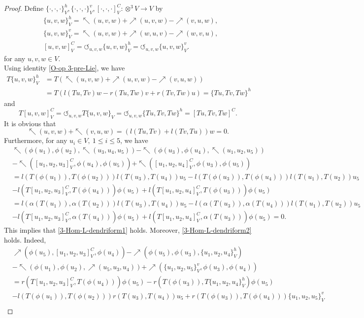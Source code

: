\documentclass[a4paper,11pt]{article}
\def\c{\cdot}
\def\nw{\nwarrow}
\def\ne{\nearrow}
\theoremstyle{definition}
\begin{document}
\begin{proof}
  Define $\{\c,\c,\c\}_V^h, \{\c,\c,\c\}_V^v,[\c,\c,\c]^C_V:\otimes^3V \to V$ by
\begin{align*}
& \{u,v,w\}_V^h=\nw(u,v,w)+\ne(u,v,w)-\ne(v,u,w),\\
& \{u,v,w\}_V^v=\nw(u,v,w)+\ne(w,u,v)-\ne(w,v,u),\\
&[u,v,w]^C_V=\circlearrowleft_{u,v,w}\{u,v,w\}_V^h=\circlearrowleft_{u,v,w}\{u,v,w\}_V^v.
\end{align*}
for any $u,v,w \in V$.\\
Using identity \eqref{O-op 3-pre-Lie}, we have
\begin{align*}
T\{u,v,w\}_V^h &=T(\nw(u,v,w)+\ne(u,v,w)-\ne(v,u,w))\\
&=T(l(Tu,Tv)w-r(Tu,Tw)v+r(Tv,Tw)u)=\{Tu,Tv,Tw\}^h
\end{align*}
and
$$T[u,v,w]^C_V=\circlearrowleft_{u,v,w}T\{u,v,w\}_V
=\circlearrowleft_{u,v,w}\{Tu,Tv,Tw\}^h=[Tu,Tv,Tw]^C.$$
It is obvious that
$$\nw(u,v,w)+ \nw(v,u,w)= ( l(Tu,Tv)+l(Tv,Tu))w=0.$$
Furthermore, for any $u_i \in V,\ 1 \leq i \leq 5$, we have
\begin{align*}
&   \nw(\phi(u_1),\phi(u_2),\nw(u_3,u_4,u_5))-  \nw(\phi(u_3),\phi(u_4),\nw(u_1,u_2,u_5)) \\
&-\nw([u_1,u_2,u_3]_V^C,\phi(u_4),\phi(u_5))+\nw([u_1,u_2,u_4]_V^C,\phi(u_3),\phi(u_5)) \\
&= l(T(\phi(u_1)),T(\phi(u_2)))l(T(u_3),T(u_4))u_5-  l(T(\phi(u_3)),T(\phi(u_4)))l(T(u_1),T(u_2))u_5 \\
&-l(T[u_1,u_2,u_3]_V^C,T(\phi(u_4)))\phi(u_5)+l(T[u_1,u_2,u_4]_V^C,T(\phi(u_3)))\phi(u_5) \\
&=l(\alpha(T(u_1)),\alpha(T(u_2)))l(T(u_3),T(u_4))u_5-  l(\alpha(T(u_3)),\alpha(T(u_4)))l(T(u_1),T(u_2))u_5 \\
&-l(T[u_1,u_2,u_3]_V^C,\alpha(T(u_4)))\phi(u_5)+l(T[u_1,u_2,u_4]_V^C,\alpha(T(u_3)))\phi(u_5) =0.
\end{align*}
This implies that \eqref{3-Hom-L-dendriform1} holds.
Moreover, \eqref{3-Hom-L-dendriform2} holds. Indeed,
\begin{align*}
& \ne(\phi(u_5),[u_1,u_2,u_3]_V^C,\phi(u_4))-\ne(\phi(u_5),\phi(u_3),\{u_1,u_2,u_4\}^h_V) \\
&- \nw(\phi(u_1),\phi(u_2),\ne(u_5,u_3,u_4)) +\ne(\{u_1,u_2,u_5\}^v_V,\phi(u_3),\phi(u_4)) \\
&=r(T[u_1,u_2,u_3]_V^C,T(\phi(u_4)))\phi(u_5)-r(T(\phi(u_3)),T\{u_1,u_2,u_4\}^h_V)\phi(u_5) \\
&-l(T(\phi(u_1)),T(\phi(u_2)))r(T(u_3),T(u_4))u_5 +r(T(\phi(u_3)),T(\phi(u_4)))\{u_1,u_2,u_5\}^v_V \\

\end{align*}
\end{proof}
\end{document}
